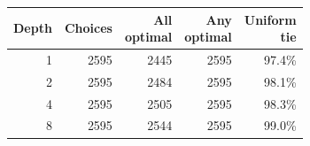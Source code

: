\begin{tabular}{rrrrr}\toprule
Depth & Choices & \shortstack{All\\optimal} & \shortstack{Any\\optimal} & \shortstack{Uniform\\tie}\\\midrule
1 & 2595 & 2445 & 2595 & 97.4\%\\
2 & 2595 & 2484 & 2595 & 98.1\%\\
4 & 2595 & 2505 & 2595 & 98.3\%\\
8 & 2595 & 2544 & 2595 & 99.0\%\\
\bottomrule\end{tabular}
